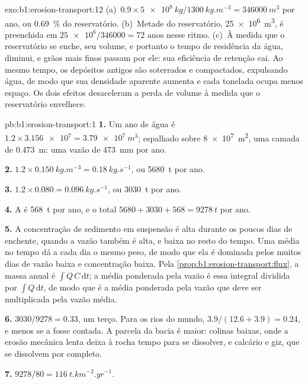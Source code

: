 \begin{solution}{exo:b1:erosion-transport:12}
(a)~$0.9 \times \qty{5e8}{kg}/\qty{1300}{kg.m^{-3}} = \qty{346000}{m^3}$ por ano,
ou \qty{0.69}{\percent} do reservatório. (b)~Metade do reservatório,
\qty{25e6}{m^3}, é preenchida em $\num{25e6}/\num{346000} = \num{72}\text{ anos}$ nesse ritmo. (c)~À medida que o reservatório se enche, seu volume, e portanto o tempo de residência da
água, diminui, e grãos mais finos passam por ele: sua eficiência de retenção cai.
Ao mesmo tempo, os depósitos antigos são soterrados e compactados, expulsando água, de modo que
sua densidade aparente aumenta e cada tonelada ocupa menos espaço. Os dois efeitos desaceleram
a perda de volume à medida que o reservatório envelhece.
\end{solution}

\begin{solution}{pb:b1:erosion-transport:1}
\textbf{1.} Um ano de água é $1.2 \times \num{3.156e7} = \qty{3.79e7}{m^3}$;
espalhado sobre \qty{8e7}{m^2}, uma camada de \qty{0.473}{m}: uma vazão de
\qty{473}{mm} por ano.

\textbf{2.} $1.2 \times \qty{0.150}{kg.m^{-3}} = \qty{0.18}{kg.s^{-1}}$, ou
\qty{5680}{t} por ano.

\textbf{3.} $1.2 \times 0.080 = \qty{0.096}{kg.s^{-1}}$, ou \qty{3030}{t} por
ano.

\textbf{4.} A  é \qty{568}{t} por ano, e o total $5680 + 3030 +
568 = \qty{9278}{t}$ por ano.

\textbf{5.} A concentração de sedimento em suspensão é alta durante os poucos dias de enchente, quando a vazão também é alta, e baixa no resto do tempo. Uma média no tempo dá a cada dia o mesmo peso, de modo que ela é dominada pelos muitos dias de vazão baixa e concentração baixa. Pela
\cref{prop:b1:erosion-transport:flux}, a massa anual é $\int Q\,C\,\mathrm dt$; a média ponderada pela vazão é essa integral dividida por
$\int Q\,\mathrm dt$, de modo que é a média ponderada pela vazão que deve ser multiplicada pela vazão média.

\textbf{6.} $3030/9278 = \num{0.33}$, um terço. Para os rios do mundo, $3.9/(12.6 + 3.9) = \num{0.24}$, e menos se a  fosse contada. A parcela da bacia é maior: colinas baixas, onde a erosão mecânica lenta deixa à rocha tempo para se dissolver, e calcário e giz, que se dissolvem por completo.

\textbf{7.} $9278/80 = \qty{116}{t.km^{-2}.yr^{-1}}$.


\end{solution}

